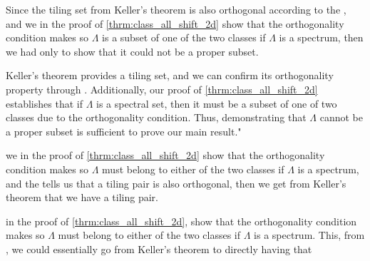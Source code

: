 \documentclass[../thesis.tex]{subfiles}
\begin{document}
Since the tiling set from Keller's theorem is also orthogonal according to the , and we in the proof of \cref{thrm:class_all_shift_2d} show that the orthogonality condition makes so $\Lambda$ is a subset of one of the two classes if $\Lambda$ is a spectrum, then we had only to show that it could not be a proper subset.  

Keller's theorem provides a tiling set, and we can confirm its orthogonality property through . Additionally, our proof of \cref{thrm:class_all_shift_2d} establishes that if $\Lambda$ is a spectral set, then it must be a subset of one of two classes due to the orthogonality condition. Thus, demonstrating that $\Lambda$ cannot be a proper subset is sufficient to prove our main result."


we in the proof of \cref{thrm:class_all_shift_2d} show that the orthogonality condition makes so $\Lambda$ must belong to either of the two classes if $\Lambda$ is a spectrum, and the  tells us that a tiling pair is also orthogonal, then we get from Keller's theorem that we have a tiling pair. 

in the proof of \cref{thrm:class_all_shift_2d}, show that the orthogonality condition makes so $\Lambda$ must belong to either of the two classes if $\Lambda$ is a spectrum. This, from , we could essentially go from Keller's theorem to directly having that  







\end{document}
